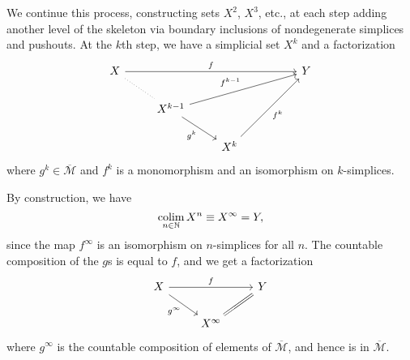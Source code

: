 \documentclass[main.tex]{subfiles}
\begin{document}
\begin{example}
  We continue this process, constructing sets $X^{2}$, $X^{3}$, etc., at each step adding another level of the skeleton via boundary inclusions of nondegenerate simplices and pushouts. At the $k$th step, we have a simplicial set $X^{k}$ and a factorization
  \begin{equation*}
    \begin{tikzcd}
      X
      \arrow[rrrr, "f"]
      \arrow[dr, dotted, no head]
      &&&& Y
      \\
      & X^{k-1}
      \arrow[urrr, "f^{k-1}"]
      \arrow[dr, swap, "g^{k}"]
      \\
      && X^{k}
      \arrow[uurr, swap, "f^{k}"]
    \end{tikzcd}
  \end{equation*}
  where $g^{k} \in \overline{\mathcal{M}}$ and $f^{k}$ is a monomorphism and an isomorphism on $k$-simplices.

  By construction, we have
  \begin{equation*}
    \operatorname*{colim}_{n \in \mathbb{N}} X^{n} \equiv X^{\infty} = Y,
  \end{equation*}
  since the map $f^{\infty}$ is an isomorphism on $n$-simplices for all $n$. The countable composition of the $g$s is equal to $f$, and we get a factorization
  \begin{equation*}
    \begin{tikzcd}
      X
      \arrow[rr, "f"]
      \arrow[dr, swap, "g^{\infty}"]
      && Y
      \\
      & X^{\infty}
      \arrow[ur, swap, equals]
    \end{tikzcd}
  \end{equation*}
  where $g^{\infty}$ is the countable composition of elements of $\overline{\mathcal{M}}$, and hence is in $\overline{\mathcal{M}}$.
\end{example}
\end{document}

